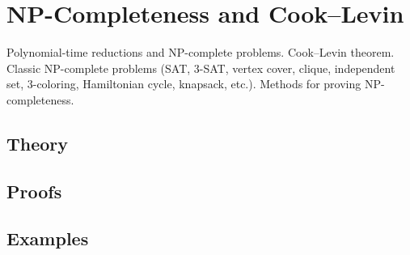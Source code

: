 
\section{NP-Completeness and Cook–Levin}
\label{sec:2.3a.12-np-completeness}

\begin{ticket}
Polynomial-time reductions and NP-complete problems. Cook–Levin theorem. Classic NP-complete problems (SAT, 3-SAT, vertex cover, clique, independent set, 3-coloring, Hamiltonian cycle, knapsack, etc.). Methods for proving NP-completeness.
\end{ticket}

\subsection*{Theory}

\subsection*{Proofs}

\subsection*{Examples}
